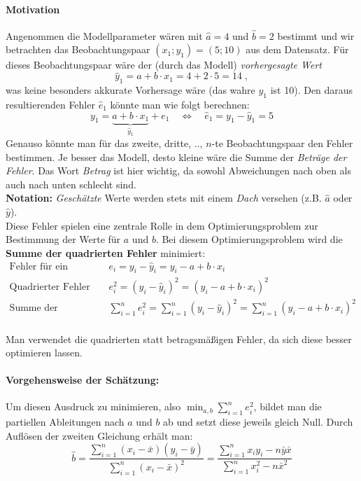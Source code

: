 \documentclass[a4paper]{article}
\newcommand\dangersign[1][2ex]{%
  \renewcommand\stacktype{L}%
  \scaleto{\stackon[1.3pt]{\color{red}$\triangle$}{\tiny !}}{#1}%
}
\begin{document}
\paragraph{Motivation} Angenommen die Modellparameter wären mit $\hat a = 4$ und $\hat b = 2$ bestimmt und wir betrachten das Beobachtungspaar $(x_1; y_1) = (5; 10)$ aus dem Datensatz. Für dieses Beobachtungspaar wäre der (durch das Modell) \textit{vorhergesagte Wert} 
$$\hat y_1 = a + b \cdot x_1 = 4 + 2 \cdot 5 = 14\;,$$
\noindent was keine besonders akkurate Vorhersage wäre (das wahre $y_1$ ist 10). Den daraus resultierenden Fehler $\hat e_1$ könnte man wie folgt berechnen:
$$y_1 = \underbrace{a + b \cdot x_1}_{\hat y_1} + e_1 \quad \Leftrightarrow \quad \hat e_1 = y_1 - \hat y_1 = 5$$
\noindent Genauso könnte man für das zweite, dritte, .., $n$-te Beobachtungspaar den Fehler bestimmen. Je besser das Modell, desto kleine wäre die Summe der \textit{Beträge der Fehler}. Das Wort \textit{Betrag} ist hier wichtig, da sowohl Abweichungen nach oben als auch nach unten schlecht sind.\\

\noindent \dangersign[3ex] \textbf{Notation:} \textit{Geschätzte} Werte werden stets mit einem \textit{Dach} versehen (z.B. $\hat a$ oder $\hat y$).\\

\noindent Diese Fehler spielen eine zentrale Rolle in dem Optimierungsproblem zur Bestimmung der Werte für $a$ und $b$. Bei diesem Optimierungsproblem wird die \textbf{Summe der quadrierten Fehler} minimiert:
\begin{align*}
    \mbox{Fehler für ein Beobachtungspaar:} &\quad e_i = y_i - \hat y_i = y_i - a + b \cdot x_i\\
    \mbox{Quadrierter Fehler für ein Beobachtungspaar:} &\quad e_i^2 = (y_i - \hat y_i)^2 = (y_i - a + b \cdot x_i)^2\\
    \mbox{Summe der quadrierten Fehler:} &\quad \sum_{i=1}^n e_i^2 = \sum_{i=1}^n (y_i - \hat y_i)^2 = \sum_{i=1}^n (y_i - a + b \cdot x_i)^2\\
\end{align*}

\noindent Man verwendet die quadrierten statt betragsmäßigen Fehler, da sich diese besser optimieren lassen.

\paragraph{Vorgehensweise der Schätzung:} Um diesen Ausdruck zu minimieren, also $\min_{a,b} \sum_{i=1}^n e_i^2$, bildet man die partiellen Ableitungen nach $a$ und $b$ ab und setzt diese jeweils gleich Null. Durch Auflösen der zweiten Gleichung erhält man: 
$$\hat{b}=\frac{\sum_{i=1}^n(x_i-\bar{x})(y_i-\bar{y})}{\sum_{i=1}^n(x_i-\bar{x})^{2}}=\frac{\sum_{i=1}^nx_iy_i-n\bar{y}\bar{x}}{\sum_{i=1}^nx_i^{2}-n\bar{x}^{2}}$$
\end{document}
